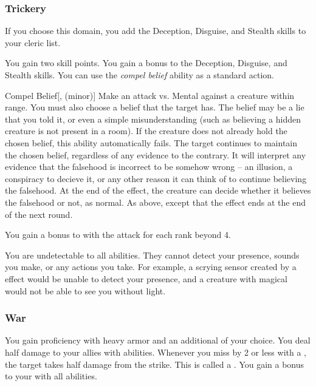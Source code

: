         \subsubsection{Trickery}
            If you choose this domain, you add the Deception, Disguise, and Stealth skills to your cleric  list.

             You gain two skill points.
             You gain a  bonus to the Deception, Disguise, and Stealth skills.
             You can use the \textit{compel belief} ability as a standard action.
            \begin{freeability}{Compel Belief}[,  (minor)]
                Make an attack vs. Mental against a creature within \rngmed range.
                You must also choose a belief that the target has.
                The belief may be a lie that you told it, or even a simple misunderstanding (such as believing a hidden creature is not present in a room).
                If the creature does not already hold the chosen belief, this ability automatically fails.
                \hit The target continues to maintain the chosen belief, regardless of any evidence to the contrary.
                It will interpret any evidence that the falsehood is incorrect to be somehow wrong -- an illusion, a conspiracy to decieve it, or any other reason it can think of to continue believing the falsehood.
                At the end of the effect, the creature can decide whether it believes the falsehood or not, as normal.
                \glance As above, except that the effect ends at the end of the next round.

                \rankline
                You gain a  bonus to  with the attack for each rank beyond 4.
            \end{freeability}
             You are undetectable to all  abilities.
            They cannot detect your presence, sounds you make, or any actions you take.
            For example, a scrying sensor created by a  effect would be unable to detect your presence, and a creature with magical  would not be able to see you without light.

        \subsubsection{War}
             You gain proficiency with heavy armor and an additional  of your choice.
             You deal half damage to your allies with  abilities.
             Whenever you miss by 2 or less with a , the target takes half damage from the strike.
            This is called a .
             You gain a  bonus to your  with all abilities.

